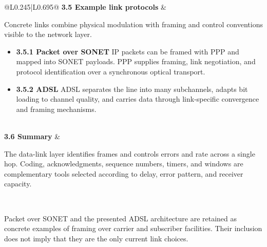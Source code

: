 \documentclass[10pt,letterpaper]{article}
\begin{document}
\begin{longtable}{@{}L{0.245\textwidth}|L{0.695\textwidth}@{}}
\textbf{3.5 Example link protocols} & \begin{minipage}[t]{\linewidth}\raggedright Concrete links combine physical modulation with framing and control conventions visible to the network layer.\par\begin{itemize}\item \textbf{3.5.1 Packet over SONET} IP packets can be framed with PPP and mapped into SONET payloads. PPP supplies framing, link negotiation, and protocol identification over a synchronous optical transport.\item \textbf{3.5.2 ADSL} ADSL separates the line into many subchannels, adapts bit loading to channel quality, and carries data through link-specific convergence and framing mechanisms.\end{itemize}\end{minipage} \\ \hline
{}\textbf{3.6 Summary} & \begin{minipage}[t]{\linewidth}\raggedright The data-link layer identifies frames and controls errors and rate across a single hop. Coding, acknowledgments, sequence numbers, timers, and windows are complementary tools selected according to delay, error pattern, and receiver capacity.\end{minipage} \\ \hline
\end{longtable}

\begin{legacybox}Packet over SONET and the presented ADSL architecture are retained as concrete examples of framing over carrier and subscriber facilities. Their inclusion does not imply that they are the only current link choices.\end{legacybox}

\end{document}
